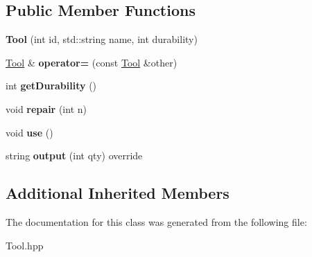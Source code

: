\subsection*{Public Member Functions}
\begin{DoxyCompactItemize}
\item 
\mbox{\label{classTool_aa7243a0145c579be44abef01ba3bc569}} 
{\bfseries Tool} (int id, std\+::string name, int durability)
\item 
\mbox{\label{classTool_adcd43e2f8568df819af67397ec491b94}} 
\hyperlink{classTool}{Tool} \& {\bfseries operator=} (const \hyperlink{classTool}{Tool} \&other)
\item 
\mbox{\label{classTool_afa7c7052d5eea4cdd741da20c62d0213}} 
int {\bfseries get\+Durability} ()
\item 
\mbox{\label{classTool_a4d5f930a0a0993f674b5622c5362e01c}} 
void {\bfseries repair} (int n)
\item 
\mbox{\label{classTool_aa979f31566ea20958ae3d01718956f2c}} 
void {\bfseries use} ()
\item 
\mbox{\label{classTool_a3357f51a73c2e40bfea4d7f90b795b33}} 
string {\bfseries output} (int qty) override
\end{DoxyCompactItemize}
\subsection*{Additional Inherited Members}


The documentation for this class was generated from the following file\+:\begin{DoxyCompactItemize}
\item 
Tool.\+hpp\end{DoxyCompactItemize}
